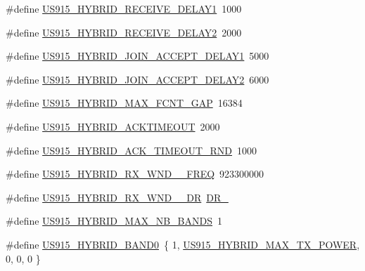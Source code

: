 \begin{DoxyCompactItemize}
\item 
\#define \mbox{\hyperlink{group___r_e_g_i_o_n_u_s915_h_y_b_ga7f976c7a9c51b01109f0b18c9c9d14a7}{U\+S915\+\_\+\+H\+Y\+B\+R\+I\+D\+\_\+\+R\+E\+C\+E\+I\+V\+E\+\_\+\+D\+E\+L\+A\+Y1}}~1000
\item 
\#define \mbox{\hyperlink{group___r_e_g_i_o_n_u_s915_h_y_b_ga253fc685fda5fcc97f80f92be8d5fcf2}{U\+S915\+\_\+\+H\+Y\+B\+R\+I\+D\+\_\+\+R\+E\+C\+E\+I\+V\+E\+\_\+\+D\+E\+L\+A\+Y2}}~2000
\item 
\#define \mbox{\hyperlink{group___r_e_g_i_o_n_u_s915_h_y_b_ga4c1ae5c7dd6fb04bb0275959d38e3bb6}{U\+S915\+\_\+\+H\+Y\+B\+R\+I\+D\+\_\+\+J\+O\+I\+N\+\_\+\+A\+C\+C\+E\+P\+T\+\_\+\+D\+E\+L\+A\+Y1}}~5000
\item 
\#define \mbox{\hyperlink{group___r_e_g_i_o_n_u_s915_h_y_b_ga8860ee877a8a686915e64f7ec6180c4a}{U\+S915\+\_\+\+H\+Y\+B\+R\+I\+D\+\_\+\+J\+O\+I\+N\+\_\+\+A\+C\+C\+E\+P\+T\+\_\+\+D\+E\+L\+A\+Y2}}~6000
\item 
\#define \mbox{\hyperlink{group___r_e_g_i_o_n_u_s915_h_y_b_ga905c03a9bea32e6d9afb2117f209dec5}{U\+S915\+\_\+\+H\+Y\+B\+R\+I\+D\+\_\+\+M\+A\+X\+\_\+\+F\+C\+N\+T\+\_\+\+G\+AP}}~16384
\item 
\#define \mbox{\hyperlink{group___r_e_g_i_o_n_u_s915_h_y_b_ga208cfcf431c114e3095c20552f5c0e77}{U\+S915\+\_\+\+H\+Y\+B\+R\+I\+D\+\_\+\+A\+C\+K\+T\+I\+M\+E\+O\+UT}}~2000
\item 
\#define \mbox{\hyperlink{group___r_e_g_i_o_n_u_s915_h_y_b_ga559607e0b707cb0266b55efa2eb38a79}{U\+S915\+\_\+\+H\+Y\+B\+R\+I\+D\+\_\+\+A\+C\+K\+\_\+\+T\+I\+M\+E\+O\+U\+T\+\_\+\+R\+ND}}~1000
\item 
\#define \mbox{\hyperlink{group___r_e_g_i_o_n_u_s915_h_y_b_gae0b62d21f2751fe9c548352e251b41dc}{U\+S915\+\_\+\+H\+Y\+B\+R\+I\+D\+\_\+\+R\+X\+\_\+\+W\+N\+D\+\_\+\_\+\+F\+R\+EQ}}~923300000
\item 
\#define \mbox{\hyperlink{group___r_e_g_i_o_n_u_s915_h_y_b_ga6149ce49b92f289c275a6c6844c38d46}{U\+S915\+\_\+\+H\+Y\+B\+R\+I\+D\+\_\+\+R\+X\+\_\+\+W\+N\+D\+\_\+\_\+\+DR}}~\mbox{\hyperlink{group___r_e_g_i_o_n_ga44cc96ba80ae464cd9330b784d329c16}{D\+R\+\_}}
\item 
\#define \mbox{\hyperlink{group___r_e_g_i_o_n_u_s915_h_y_b_ga1ddb8622d642ac6254b04f9020ccfcf7}{U\+S915\+\_\+\+H\+Y\+B\+R\+I\+D\+\_\+\+M\+A\+X\+\_\+\+N\+B\+\_\+\+B\+A\+N\+DS}}~1
\item 
\#define \mbox{\hyperlink{group___r_e_g_i_o_n_u_s915_h_y_b_gaf373565fbcca15762d7f9209e78daa6c}{U\+S915\+\_\+\+H\+Y\+B\+R\+I\+D\+\_\+\+B\+A\+N\+D0}}~\{ 1, \mbox{\hyperlink{group___r_e_g_i_o_n_u_s915_h_y_b_ga94a1ed1e5cca1f05f0ac4916e164f529}{U\+S915\+\_\+\+H\+Y\+B\+R\+I\+D\+\_\+\+M\+A\+X\+\_\+\+T\+X\+\_\+\+P\+O\+W\+ER}}, 0, 0, 0 \}

\end{DoxyCompactItemize}

